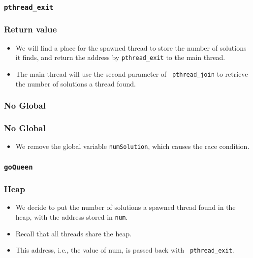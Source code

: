 \documentclass{beamer}
\begin{document}
\begin{frame}
\frametitle{\tt pthread\_exit}
\end{frame}

\begin{frame}
\frametitle{Return value}
\begin{itemize}
\item We will find a place for the spawned thread to store the number
  of solutions it finds, and return the address by {\tt pthread\_exit}
  to the main thread.
\item The main thread will use the second parameter of {\tt
  pthread\_join} to retrieve the number of solutions a thread found.
\end{itemize}
\end{frame}

\begin{frame}
\frametitle{No Global}
\end{frame}

\begin{frame}
\frametitle{No Global}
\begin{itemize}
\item We remove the global variable {\tt numSolution}, which causes
  the race condition.
\end{itemize}
\end{frame}


\begin{frame}
\frametitle{\tt goQueen}
\end{frame}

\begin{frame}
\frametitle{Heap}
\begin{itemize}
\item We decide to put the number of solutions a spawned thread found
  in the heap, with the address stored in {\tt num}.
\item Recall that all threads share the heap.
\item This address, i.e., the value of num, is passed back with {\tt
  pthread\_exit}.
\end{itemize}
\end{frame}
\end{document}
